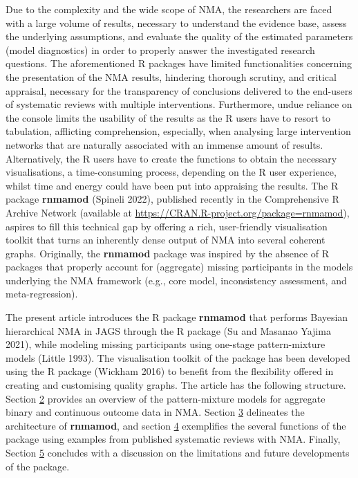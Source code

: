 Due to the complexity and the wide scope of NMA, the researchers are faced with
a large volume of results, necessary to understand the evidence base, assess the
underlying assumptions, and evaluate the quality of the estimated parameters (model
diagnostics) in order to properly answer the investigated research questions.
The aforementioned R packages have limited functionalities concerning
the presentation of the NMA results, hindering thorough scrutiny, and critical
appraisal, necessary for the transparency of conclusions delivered to the
end-users of systematic reviews with multiple interventions. Furthermore, undue
reliance on the console limits the usability of the results as the R users have
to resort to tabulation, afflicting comprehension, especially, when analysing
large intervention networks that are naturally associated with an immense amount
of results. Alternatively, the R users have to create the functions to obtain the
necessary visualisations, a time-consuming process, depending on the R user experience,
whilst time and energy could have been put into appraising the results. The R
package \textbf{rnmamod} (Spineli 2022), published recently in the Comprehensive R Archive
Network (available at
\url{https://CRAN.R-project.org/package=rnmamod}),
aspires to fill this technical gap by offering a rich, user-friendly
visualisation toolkit that turns an inherently dense output of NMA into several
coherent graphs. Originally, the \textbf{rnmamod} package was inspired by the absence of
R packages that properly account for (aggregate) missing participants in the models
underlying the NMA framework (e.g., core model, inconsistency assessment, and
meta-regression).

The present article introduces the R package \textbf{rnmamod} that performs Bayesian
hierarchical NMA in JAGS through the R package  (Su and Masanao Yajima 2021),
while modeling missing participants using one-stage pattern-mixture models (Little 1993).
The visualisation toolkit of the package has been developed using the R package
 (Wickham 2016) to benefit from the flexibility offered in creating
and customising quality graphs. The article has the following structure. Section
\protect\hyperlink{Pattern-mixture-models-for-aggregate-binary-and-continuous-outcomes}{2} provides
an overview of the pattern-mixture models for aggregate binary and continuous
outcome data in NMA. Section \protect\hyperlink{The-architecture-of-ux2fpkgux5cux257Brnmamodux5cux257D}{3} delineates
the architecture of \textbf{rnmamod}, and section \protect\hyperlink{X}{4} exemplifies the several
functions of the package using examples from published systematic reviews with NMA.
Finally, Section \protect\hyperlink{X}{5} concludes with a discussion on the limitations and future
developments of the package.

